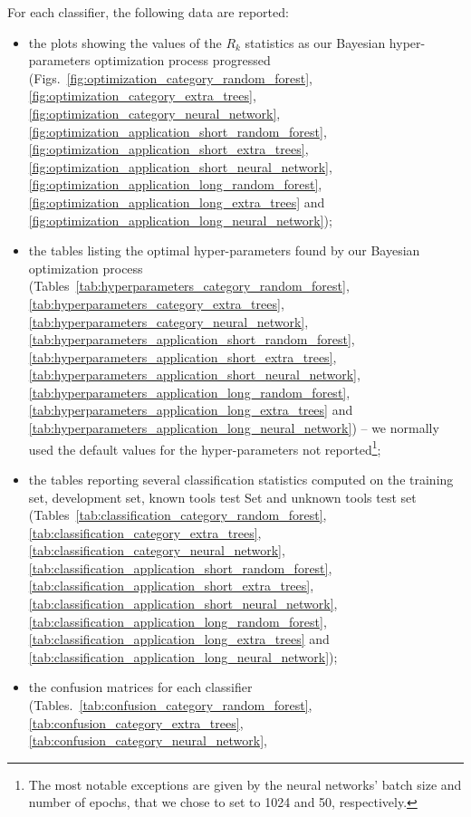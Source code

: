 \documentclass[times,review]{article}
\begin{document}
For each classifier, the following data are reported:
\begin{itemize}
    \item the plots showing the values of the $R_k$ statistics as our Bayesian hyper-parameters optimization process
    progressed (Figs.~\ref{fig:optimization_category_random_forest}, \ref{fig:optimization_category_extra_trees},
    \ref{fig:optimization_category_neural_network}, \ref{fig:optimization_application_short_random_forest},
    \ref{fig:optimization_application_short_extra_trees}, \ref{fig:optimization_application_short_neural_network},
    \ref{fig:optimization_application_long_random_forest}, \ref{fig:optimization_application_long_extra_trees} and
    \ref{fig:optimization_application_long_neural_network});
    \item the tables listing the optimal hyper-parameters found by our Bayesian optimization process
    (Tables~\ref{tab:hyperparameters_category_random_forest}, \ref{tab:hyperparameters_category_extra_trees},
    \ref{tab:hyperparameters_category_neural_network}, \ref{tab:hyperparameters_application_short_random_forest},
    \ref{tab:hyperparameters_application_short_extra_trees}, \ref{tab:hyperparameters_application_short_neural_network},
    \ref{tab:hyperparameters_application_long_random_forest}, \ref{tab:hyperparameters_application_long_extra_trees}
    and \ref{tab:hyperparameters_application_long_neural_network}) -- we normally used the default values for the
    hyper-parameters not reported\footnote{The most notable exceptions are given by the neural networks' batch size and
    number of epochs, that we chose to set to 1024 and 50, respectively.};
    \item the tables reporting several classification statistics computed on the training set, development set, known
    tools test Set and unknown tools test set (Tables~\ref{tab:classification_category_random_forest},
    \ref{tab:classification_category_extra_trees}, \ref{tab:classification_category_neural_network},
    \ref{tab:classification_application_short_random_forest}, \ref{tab:classification_application_short_extra_trees},
    \ref{tab:classification_application_short_neural_network}, \ref{tab:classification_application_long_random_forest},
    \ref{tab:classification_application_long_extra_trees} and \ref{tab:classification_application_long_neural_network});
    \item the confusion matrices for each classifier (Tables.~\ref{tab:confusion_category_random_forest},
    \ref{tab:confusion_category_extra_trees}, \ref{tab:confusion_category_neural_network},

\end{itemize}
\end{document}
